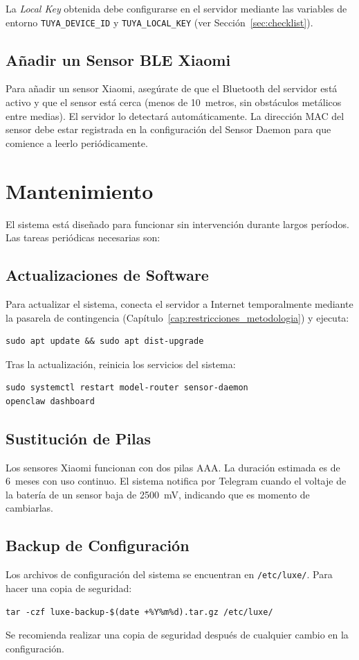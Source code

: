 La \textit{Local Key} obtenida debe configurarse en el servidor mediante las variables de entorno \texttt{TUYA\_DEVICE\_ID} y \texttt{TUYA\_LOCAL\_KEY} (ver Sección~\ref{sec:checklist}).

\subsection{Añadir un Sensor BLE Xiaomi}

Para añadir un sensor Xiaomi, asegúrate de que el Bluetooth del servidor está activo y que el sensor está cerca (menos de 10~metros, sin obstáculos metálicos entre medias). El servidor lo detectará automáticamente. La dirección MAC del sensor debe estar registrada en la configuración del Sensor Daemon para que comience a leerlo periódicamente.

\section{Mantenimiento}

El sistema está diseñado para funcionar sin intervención durante largos períodos. Las tareas periódicas necesarias son:

\subsection{Actualizaciones de Software}
\label{sec:actualizaciones}
Para actualizar el sistema, conecta el servidor a Internet temporalmente mediante la pasarela de contingencia (Capítulo~\ref{cap:restricciones_metodologia}) y ejecuta:
\begin{verbatim}
sudo apt update && sudo apt dist-upgrade
\end{verbatim}
Tras la actualización, reinicia los servicios del sistema:
\begin{verbatim}
sudo systemctl restart model-router sensor-daemon
openclaw dashboard
\end{verbatim}

\subsection{Sustitución de Pilas}
Los sensores Xiaomi funcionan con dos pilas AAA. La duración estimada es de 6~meses con uso continuo. El sistema notifica por Telegram cuando el voltaje de la batería de un sensor baja de 2500~mV, indicando que es momento de cambiarlas.

\subsection{Backup de Configuración}
Los archivos de configuración del sistema se encuentran en \texttt{/etc/luxe/}. Para hacer una copia de seguridad:
\begin{verbatim}
tar -czf luxe-backup-$(date +%Y%m%d).tar.gz /etc/luxe/
\end{verbatim}
Se recomienda realizar una copia de seguridad después de cualquier cambio en la configuración.

